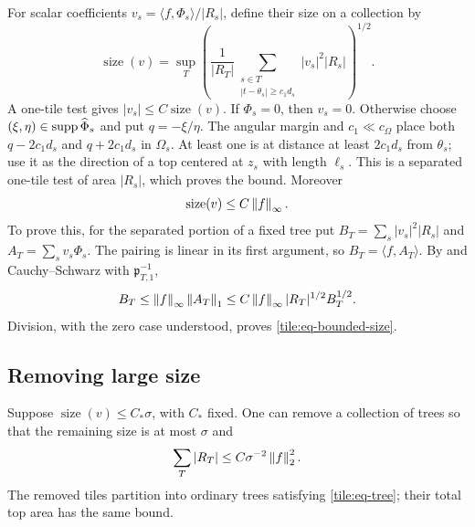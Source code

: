 For scalar coefficients
\(v_s=\langle f,\Phi_s\rangle/|R_s|\), define their size on
a collection by
\begin{equation}\label{tile:eq-size}
 \operatorname{size}(v)=
 \sup_T
 \left(\frac{1}{|R_T|}
       \sum_{\substack{s\in T\\|t-\theta_s|\geq c_1d_s}}
                       |v_s|^2|R_s|\right)^{1/2}.
\end{equation}
A one-tile test gives \(|v_s|\leq C\operatorname{size}(v)\).
If \(\Phi_s=0\), then \(v_s=0\). Otherwise choose
\((\xi,\eta)\in\operatorname{supp}\widehat\Phi_s\) and put \(q=-\xi/\eta\).
The angular margin and \(c_1\ll c_\Omega\) place both
\(q-2c_1d_s\) and \(q+2c_1d_s\) in \(\Omega_s\).
At least one is at distance at least \(2c_1d_s\) from \(\theta_s\);
use it as the direction of a top centered at \(z_s\) with length
\(\ell_s\). This is a separated one-tile test of area \(|R_s|\),
which proves the bound.
Moreover
\begin{equation}\label{tile:eq-bounded-size}
 \operatorname{size}(v)\leq C\left\|f\right\|_\infty.
\end{equation}
To prove this, for the separated portion of a fixed tree put
\(B_T=\sum_s|v_s|^2|R_s|\) and
\(A_T=\sum_s v_s\Phi_s\).  The pairing is linear in its first
argument, so \(B_T=\langle f,A_T\rangle\).  By
 and Cauchy--Schwarz with
\(\mathfrak p_{T,1}^{-1}\),
\[
 B_T\leq\left\|f\right\|_\infty\left\|A_T\right\|_1
 \leq C\left\|f\right\|_\infty |R_T|^{1/2}B_T^{1/2}.
\]
Division, with the zero case understood, proves
\eqref{tile:eq-bounded-size}.

\subsection{Removing large size}

\begin{lemma}\label{tile:lem-size}
Suppose \(\operatorname{size}(v)\leq C_*\sigma\), with
\(C_*\) fixed.  One can remove a collection of trees so that
the remaining size is at most \(\sigma\) and
\begin{equation}\label{tile:eq-size-budget}
 \sum_T|R_T|\leq C\sigma^{-2}\left\|f\right\|_2^2.
\end{equation}
The removed tiles partition into ordinary trees satisfying
\eqref{tile:eq-tree}; their total top area has the same bound.
\end{lemma}

